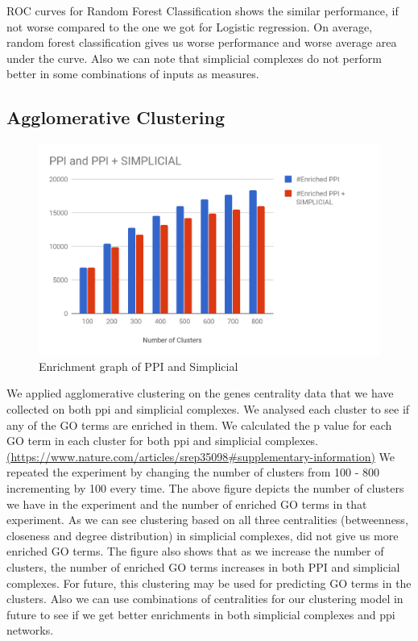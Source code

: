 \documentclass[9pt]{article}
\begin{document}
ROC curves for Random Forest Classification shows the similar performance, if not worse compared to the one we got for Logistic regression. On average, random forest classification gives us worse performance and worse average area under the curve. Also we can note that simplicial complexes do not perform better in some combinations of inputs as measures.

\subsection{Agglomerative Clustering}
\begin{figure}[!htb]
  \centering
  \includegraphics[width=\linewidth]{logisticRegressionGraphs/cluster.png}
\endminipage
\caption{Enrichment graph of PPI and Simplicial}
\end{figure}
We applied agglomerative clustering on the genes centrality data that we have collected on both ppi and simplicial complexes. We analysed each cluster to see if any of the GO terms are enriched in them. We calculated the p value for each GO term in each cluster for both ppi and simplicial complexes.\url{(https://www.nature.com/articles/srep35098\#supplementary-information)} We repeated the experiment by changing the number of clusters from 100 - 800 incrementing by 100 every time. The above figure depicts the number of clusters we have in the experiment and the number of enriched GO terms in that experiment. As we can see clustering based on all three centralities (betweenness, closeness and degree distribution) in simplicial complexes, did not give us more enriched GO terms. The figure also shows that as we increase the number of clusters, the number of enriched GO terms increases in both PPI and simplicial complexes. For future, this clustering may be used for predicting GO terms in the clusters. Also we can use combinations of centralities for our clustering model in future to see if we get better enrichments in both simplicial complexes and ppi networks. 
\end{document}
